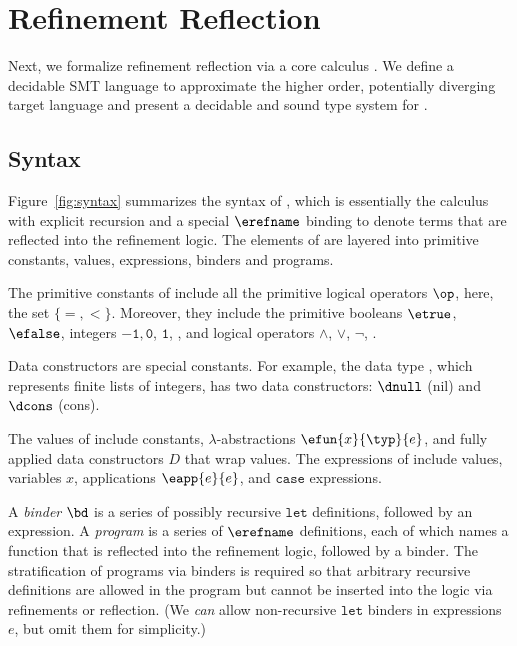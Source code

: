 \section{Refinement Reflection}
\label{sec:formalism}
\label{sec:types-reflection}
\label{sec:refinementreflection"theory}
Next, we formalize refinement reflection
via a core calculus \corelan.
%
We define a decidable SMT language \smtlan to approximate the
higher order, potentially diverging
target language \corelan
and present a decidable and sound type system
for \corelan.

\subsection{Syntax}

%
Figure~\ref{fig:syntax} summarizes the syntax of \corelan,
which is essentially the calculus \undeclang~\cite{Vazou14}
with explicit recursion and a special $\erefname$ binding
to denote terms that are reflected into the refinement logic.
%
The elements of \corelan are layered into
primitive constants, values, expressions, binders
and programs.

The primitive constants of \corelan
include all the primitive logical
operators $\op$, here, the set $\{ =, <\}$.
%
Moreover, they include the
primitive booleans $\etrue$, $\efalse$,
integers $\mathtt{-1}, \mathtt{0}$, $\mathtt{1}$, \etc,
and logical operators $\mathtt{\land}$, $\mathtt{\lor}$, $\mathtt{\lnot}$, \etc.

%
Data constructors are special constants.
For example, the data type \tintlist, which represents
finite lists of integers, has two data constructors: $\dnull$ (nil)
and $\dcons$ (cons).

%
The values of \corelan include
constants, $\lambda$-abstractions
$\efun{x}{\typ}{e}$, and fully
applied data constructors $D$
that wrap values.
%
The expressions of \corelan
include values, variables $x$,
applications $\eapp{e}{e}$, and
$\mathtt{case}$ expressions.

%
A \emph{binder} $\bd$ is a series of possibly recursive
$\mathtt{let}$ definitions, followed by an expression.
%
A \emph{program} \prog is a series of $\erefname$
definitions, each of which names a function
that is reflected into the refinement
logic, followed by a binder.
%
The stratification of programs via binders
is required so that arbitrary recursive definitions
are allowed in the program but cannot be inserted into the logic
via refinements or reflection.
%
(We \emph{can} allow non-recursive $\mathtt{let}$
binders in expressions $e$, but omit them for simplicity.)

